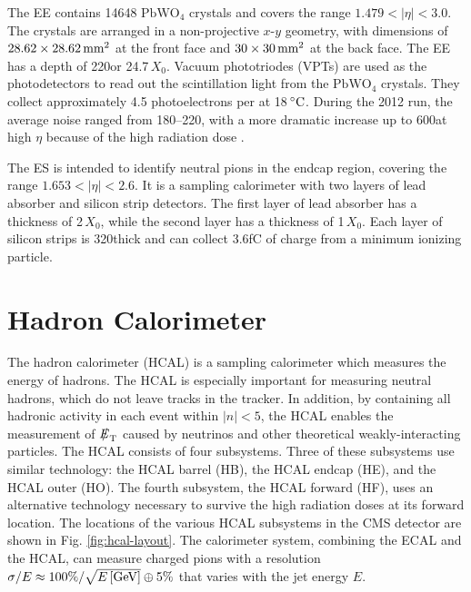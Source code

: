 \documentclass[12pt]{thesis}  %
\newcommand{\pbwo}{\ensuremath{\text{PbWO}_{4}}\xspace}
\newcommand{\degC}{\ensuremath{\,\de\text{C}}\xspace}
\def\eslash{\ensuremath{{\hbox{$E$\kern-0.6em\lower-.05ex\hbox{/}\kern0.10em}}}}
\def\met{\mbox{$\eslash_\text{T}$}\xspace} %
\begin{document}
The EE contains 14648 \pbwo crystals and covers the range $1.479<|\eta|<3.0$. The crystals are arranged in a non-projective $x$-$y$ geometry, with dimensions of $28.62\times28.62\,\text{mm}^{2}$ at the front face and $30\times30\,\text{mm}^{2}$ at the back face. The EE has a depth of 220\mm or 24.7$\,X_{0}$. Vacuum phototriodes (VPTs) are used as the photodetectors to read out the scintillation light from the \pbwo crystals. They collect approximately 4.5 photoelectrons per \MeVns at 18\degC. During the 2012 run, the average noise ranged from 180--220\MeV, with a more dramatic increase up to 600\MeV at high $\eta$ because of the high radiation dose \cite{CMS:2013ecal}.

The ES is intended to identify neutral pions in the endcap region, covering the range $1.653<|\eta|<2.6$. It is a sampling calorimeter with two layers of lead absorber and silicon strip detectors. The first layer of lead absorber has a thickness of 2$\,X_{0}$, while the second layer has a thickness of 1$\,X_{0}$. Each layer of silicon strips is 320\mum thick and can collect 3.6\unit{fC} of charge from a minimum ionizing particle.


\section{Hadron Calorimeter}

The hadron calorimeter (HCAL) is a sampling calorimeter which measures the energy of hadrons. The HCAL is especially important for measuring neutral hadrons, which do not leave tracks in the tracker. In addition, by containing all hadronic activity in each event within $|n|<5$, the HCAL enables the measurement of \met caused by neutrinos and other theoretical weakly-interacting particles. The HCAL consists of four subsystems. Three of these subsystems use similar technology: the HCAL barrel (HB), the HCAL endcap (HE), and the HCAL outer (HO). The fourth subsystem, the HCAL forward (HF), uses an alternative technology necessary to survive the high radiation doses at its forward location. The locations of the various HCAL subsystems in the CMS detector are shown in Fig. \ref{fig:hcal-layout}. The calorimeter system, combining the ECAL and the HCAL, can measure charged pions with a resolution $\sigma/E \approx 100\% / \sqrt{E\,[\text{Ge\hspace{-.08em}V}]} \oplus 5\%$ that varies with the jet energy $E$.
\end{document}
